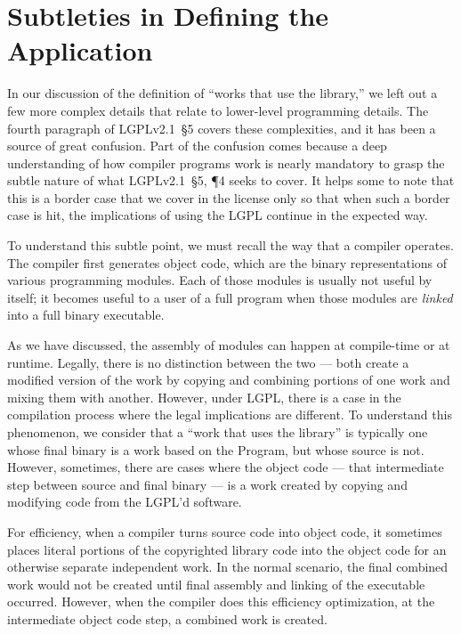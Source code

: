 \section{Subtleties in Defining the Application}

In our discussion of the definition of ``works that use the library,'' we
left out a few more complex details that relate to lower-level programming
details. The fourth paragraph of LGPLv2.1~\S5 covers these complexities,
and it has been a source of great confusion. Part of the confusion comes
because a deep understanding of how compiler programs work is nearly
mandatory to grasp the subtle nature of what LGPLv2.1~\S5, \P 4 seeks to
cover. It helps some to note that this is a border case that we cover in
the license only so that when such a border case is hit, the implications
of using the LGPL continue in the expected way.

To understand this subtle point, we must recall the way that a compiler
operates. The compiler first generates object code, which are the binary
representations of various programming modules. Each of those modules is
usually not useful by itself; it becomes useful to a user of a full program
when those modules are {\em linked\/} into a full binary executable.

As we have discussed, the assembly of modules can happen at compile-time
or at runtime. Legally, there is no distinction between the two --- both
create a modified version of the work by copying and combining portions of one work and
mixing them with another. However, under LGPL, there is a case in the
compilation process where the legal implications are different.
To understand this phenomenon, we consider that a ``work that uses the
library'' is typically one whose final binary is a work based on the Program,
but whose source is not.  However, sometimes, there
are cases where the object code --- that intermediate step between source
and final binary --- is a work created by copying and modifying code
from the LGPL'd software.

For efficiency, when a compiler turns source code into object code, it
sometimes places literal portions of the copyrighted library code into the
object code for an otherwise separate independent work. In the normal
scenario, the final combined work would not be created until final assembly and
linking of the executable occurred. However, when the compiler does this
efficiency optimization, at the intermediate object code step, a
combined work is created.

